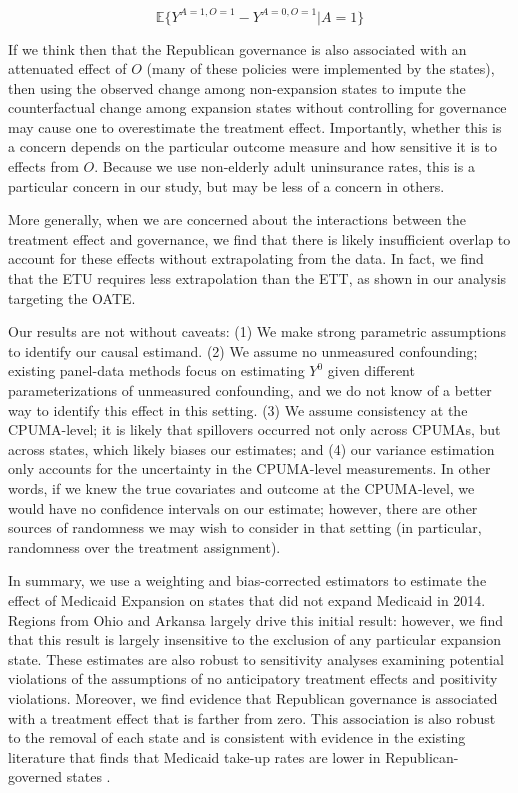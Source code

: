 \documentclass[final]{article}
\begin{document}
$$
\mathbb{E}\{Y^{A = 1, O = 1} - Y^{A = 0, O = 1} | A = 1\}
$$

If we think then that the Republican governance is also associated with an attenuated effect of $O$ (many of these policies were implemented by the states), then using the observed change among non-expansion states to impute the counterfactual change among expansion states without controlling for governance may cause one to overestimate the treatment effect. Importantly, whether this is a concern depends on the particular outcome measure and how sensitive it is to effects from $O$. Because we use non-elderly adult uninsurance rates, this is a particular concern in our study, but may be less of a concern in others.

More generally, when we are concerned about the interactions between the treatment effect and governance, we find that there is likely insufficient overlap to account for these effects without extrapolating from the data. In fact, we find that the ETU requires less extrapolation than the ETT, as shown in our analysis targeting the OATE.

Our results are not without caveats: (1) We make strong parametric assumptions to identify our causal estimand. (2) We assume no unmeasured confounding; existing panel-data methods focus on estimating $Y^0$ given different parameterizations of unmeasured confounding, and we do not know of a better way to identify this effect in this setting. (3) We assume consistency at the CPUMA-level; it is likely that spillovers occurred not only across CPUMAs, but across states, which likely biases our estimates; and (4) our variance estimation only accounts for the uncertainty in the CPUMA-level measurements. In other words, if we knew the true covariates and outcome at the CPUMA-level, we would have no confidence intervals on our estimate; however, there are other sources of randomness we may wish to consider in that setting (in particular, randomness over the treatment assignment).

In summary, we use a weighting and bias-corrected estimators to estimate the effect of Medicaid Expansion on states that did not expand Medicaid in 2014. Regions from Ohio and Arkansa largely drive this initial result: however, we find that this result is largely insensitive to the exclusion of any particular expansion state. These estimates are also robust to sensitivity analyses examining potential violations of the assumptions of no anticipatory treatment effects and positivity violations. Moreover, we find evidence that Republican governance is associated with a treatment effect that is farther from zero. This association is also robust to the removal of each state and is consistent with evidence in the existing literature that finds that Medicaid take-up rates are lower in Republican-governed states \cite{sommers2012understanding}.
\end{document}
